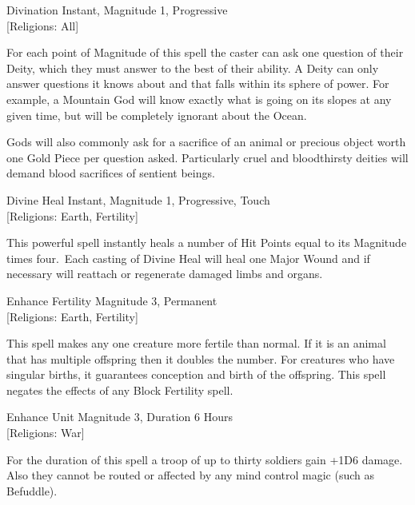 \begin{rpg-spell}
{Divination}
{Instant, Magnitude 1, Progressive\\{[Religions: All]}}

For each point of Magnitude of this spell the caster can ask one question of their Deity, which they must answer to the best of their ability. A Deity can only answer questions it knows about and that falls within its sphere of power. For example, a Mountain God will know exactly what is going on its slopes at any given time, but will be completely ignorant about the Ocean.

Gods will also commonly ask for a sacrifice of an animal or precious object worth one Gold Piece per question asked. Particularly cruel and bloodthirsty deities will demand blood sacrifices of sentient beings.
\end{rpg-spell}

\begin{rpg-spell}
{Divine Heal}
{Instant, Magnitude 1, Progressive, Touch\\{[Religions: Earth, Fertility]}}

This powerful spell instantly heals a number of Hit Points equal to its Magnitude times four. Each casting of Divine Heal will heal one Major Wound and if necessary will reattach or regenerate damaged limbs and organs.  
\end{rpg-spell}

\begin{rpg-spell}
{Enhance Fertility}
{Magnitude 3, Permanent\\{[Religions: Earth, Fertility]}}

This spell makes any one creature more fertile than normal. If it is an animal that has multiple offspring then it doubles the number. For creatures who have singular births, it guarantees conception and birth of the offspring. This spell negates the effects of any Block Fertility spell. 
\end{rpg-spell}

\begin{rpg-spell}
{Enhance Unit}
{Magnitude 3, Duration 6 Hours\\{[Religions: War]}}

For the duration of this spell a troop of up to thirty soldiers gain +1D6 damage. Also they cannot be routed or affected by any mind control magic (such as Befuddle).
\end{rpg-spell}

